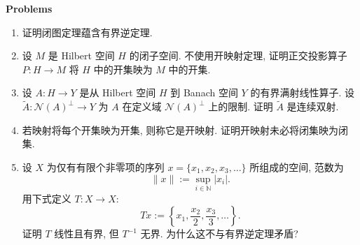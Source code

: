\textbf{Problems}

\begin{enumerate}[label=\thesection.\arabic*.,ref=\thesection.\arabic*,start=12,series=book-problems]

\item\label{ex:closed-graph-implies-bounded-inverse} 证明闭图定理蕴含有界逆定理.

\item\label{ex:orthogonal-projection-open-map} 设 $M$ 是 Hilbert 空间 $H$ 的闭子空间. 不使用开映射定理, 证明正交投影算子 $P:H\to M$ 将 $H$ 中的开集映为 $M$ 中的开集.

\item\label{ex:surjective-hilbert-operator-null-complement-bijection} 设 $A:H\to Y$ 是从 Hilbert 空间 $H$ 到 Banach 空间 $Y$ 的有界满射线性算子. 设 $\widetilde A:\mathcal{N}(A)^\perp\to Y$ 为 $A$ 在定义域 $\mathcal{N}(A)^\perp$ 上的限制. 证明 $\widetilde A$ 是连续双射.

\item\label{ex:open-map-need-not-preserve-closed-sets} 若映射将每个开集映为开集, 则称它是开映射. 证明开映射未必将闭集映为闭集.

\item\label{ex:incomplete-finite-sequence-bounded-inverse-counterexample} 设 $X$ 为仅有有限个非零项的序列 $x=\{x_1,x_2,x_3,\ldots\}$ 所组成的空间, 范数为\[\|x\|:=\sup_{i\in\mathbb{N}}|x_i|.\]用下式定义 $T:X\to X$:\[Tx:=\left\{x_1,\dfrac{x_2}{2},\dfrac{x_3}{3},\ldots\right\}.\]证明 $T$ 线性且有界, 但 $T^{-1}$ 无界. 为什么这不与有界逆定理矛盾?

\end{enumerate}
